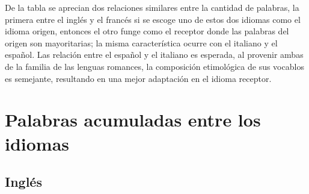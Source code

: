 De la tabla se aprecian dos relaciones similares entre la cantidad de palabras, la primera entre el inglés y el francés si se escoge uno de estos dos idiomas como el idioma origen, entonces el otro funge como el receptor donde las palabras del origen son mayoritarias; la misma característica ocurre con el italiano y el español.  Las relación entre el español y el italiano es esperada, al provenir ambas de la familia de las lenguas romances, la composición etimológica de sus vocablos es semejante,  resultando en una mejor adaptación en el idioma receptor.



\newpage

\section{Palabras acumuladas entre los idiomas}

\subsection{Inglés}

